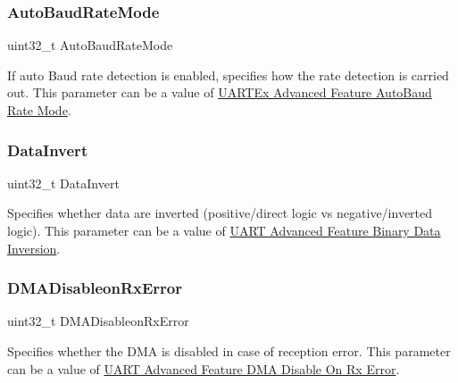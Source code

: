 \subsubsection{\texorpdfstring{Auto\+Baud\+Rate\+Mode}{AutoBaudRateMode}}
{\footnotesize\ttfamily uint32\+\_\+t Auto\+Baud\+Rate\+Mode}

If auto Baud rate detection is enabled, specifies how the rate detection is carried out. This parameter can be a value of \hyperlink{group___u_a_r_t_ex___auto_baud___rate___mode}{U\+A\+R\+T\+Ex Advanced Feature Auto\+Baud Rate Mode}. \mbox{\label{struct_u_a_r_t___adv_feature_init_type_def_a1feb1398f541e95a819aea3aed2d7552}} 
\subsubsection{\texorpdfstring{Data\+Invert}{DataInvert}}
{\footnotesize\ttfamily uint32\+\_\+t Data\+Invert}

Specifies whether data are inverted (positive/direct logic vs negative/inverted logic). This parameter can be a value of \hyperlink{group___u_a_r_t___data___inv}{U\+A\+RT Advanced Feature Binary Data Inversion}. \mbox{\label{struct_u_a_r_t___adv_feature_init_type_def_a8ebe515413b9d135fc10d8b6d7a81ac9}} 
\subsubsection{\texorpdfstring{D\+M\+A\+Disableon\+Rx\+Error}{DMADisableonRxError}}
{\footnotesize\ttfamily uint32\+\_\+t D\+M\+A\+Disableon\+Rx\+Error}

Specifies whether the D\+MA is disabled in case of reception error. This parameter can be a value of \hyperlink{group___u_a_r_t___d_m_a___disable__on___rx___error}{U\+A\+RT Advanced Feature D\+MA Disable On Rx Error}. \mbox{\label{struct_u_a_r_t___adv_feature_init_type_def_a4533506da01ae4e82bf4dd7211fb1c45}} 
